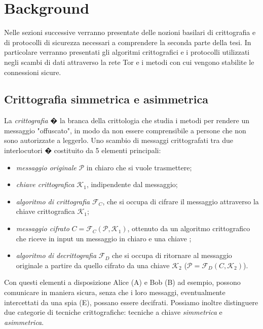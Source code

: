 \chapter{Background}
Nelle sezioni successive verranno presentate delle nozioni basilari di crittografia e di protocolli di sicurezza necessari a comprendere la seconda parte della tesi. In particolare verranno presentati gli algoritmi crittografici e i protocolli utilizzati negli scambi di dati attraverso la rete Tor e i metodi con cui vengono stabilite le connessioni sicure. 

\section{Crittografia simmetrica e asimmetrica}
La \emph{crittografia} � la branca della crittologia che studia i metodi per rendere un messaggio "offuscato", in modo da non essere comprensibile a persone che non sono autorizzate a leggerlo. %
Uno scambio di messaggi crittografati tra due interlocutori � costituito da 5 elementi principali:

\begin{itemize}
\item \emph{messaggio originale} $\mathcal{P}$ in chiaro che si vuole trasmettere;
\item \emph{chiave crittografica} $\mathcal{K}_{1}$, indipendente dal messaggio;
\item \emph{algoritmo di crittografia} $\mathcal{F}_{C}$, che si occupa di cifrare il messaggio attraverso la chiave crittografica $\mathcal{K}_{1}$;
\item \emph{messaggio cifrato} $C=\mathcal{F}_{C}(\mathcal{P},\mathcal{K}_{1})$, ottenuto da un algoritmo crittografico che riceve in input un messaggio in chiaro e una chiave ;
\item \emph{algoritmo di decrittografia} $\mathcal{F}_{D}$ che si occupa di ritornare al messaggio originale a partire da quello cifrato da una chiave $\mathcal{K}_{2}$ ($\mathcal{P}=\mathcal{F}_{D}(C,\mathcal{K}_{2})$).
\end{itemize}
Con questi elementi a disposizione Alice (A) e Bob (B) ad esempio,  possono comunicare in maniera sicura, senza che i loro messaggi, eventualmente intercettati da una spia (E), possano essere decifrati. 
Possiamo inoltre distinguere due categorie di tecniche crittografiche: tecniche a chiave \emph{simmetrica} e \emph{asimmetrica}. 

